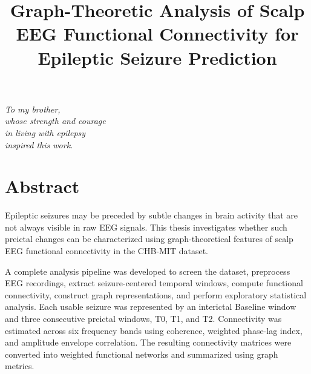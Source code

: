 \documentclass[a4paper,singleside,12pt]{report}
\begin{document}

    \title{Graph-Theoretic Analysis of Scalp EEG Functional Connectivity for Epileptic Seizure Prediction}






    \frontispiece
    \newpage
    \begin{flushright}
    \emph{
    \LARGE{To my brother,}\\\vspace{2mm} 
    \LARGE{whose strength and courage}\\\vspace{2mm} 
    \LARGE{in living with epilepsy}\\\vspace{2mm} 
    \LARGE{inspired this work.}\\\vspace{2mm} 
    }
    \end{flushright}

    
    \chapter*{Abstract}
    Epileptic seizures may be preceded by subtle changes in brain activity that are
    not always visible in raw EEG signals. This thesis investigates whether such
    preictal changes can be characterized using graph-theoretical features of scalp
    EEG functional connectivity in the CHB-MIT dataset.

    A complete analysis pipeline was developed to screen the dataset, preprocess EEG
    recordings, extract seizure-centered temporal windows, compute functional
    connectivity, construct graph representations, and perform exploratory
    statistical analysis. Each usable seizure was represented by an interictal
    Baseline window and three consecutive preictal windows, T0, T1, and T2.
    Connectivity was estimated across six frequency bands using coherence, weighted
    phase-lag index, and amplitude envelope correlation. The resulting connectivity
    matrices were converted into weighted functional networks and summarized using
    graph metrics.
\end{document}
